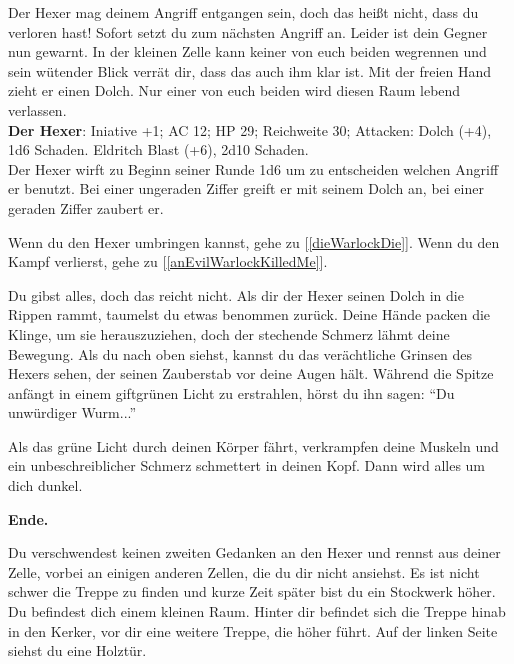 
Der Hexer mag deinem Angriff entgangen sein, doch das heißt nicht, dass du verloren hast! Sofort setzt du zum nächsten Angriff an. Leider ist dein Gegner nun gewarnt. In der kleinen Zelle kann keiner von euch beiden wegrennen und sein wütender Blick verrät dir, dass das auch ihm klar ist. Mit der freien Hand zieht er einen Dolch. Nur einer von euch beiden wird diesen Raum lebend verlassen.\\

\textbf{Der Hexer}: Iniative +1;
AC 12;
HP 29;
Reichweite 30;
Attacken: Dolch (+4), 1d6 Schaden. Eldritch Blast (+6), 2d10 Schaden.\\

Der Hexer wirft zu Beginn seiner Runde 1d6 um zu entscheiden welchen Angriff er benutzt. Bei einer ungeraden Ziffer greift er mit seinem Dolch an, bei einer geraden Ziffer zaubert er.

Wenn du den Hexer umbringen kannst, gehe zu [\ref{dieWarlockDie}].
Wenn du den Kampf verlierst, gehe zu [\ref{anEvilWarlockKilledMe}].


Du gibst alles, doch das reicht nicht. Als dir der Hexer seinen Dolch in die Rippen rammt, taumelst du etwas benommen zurück. Deine Hände packen die Klinge, um sie herauszuziehen, doch der stechende Schmerz lähmt deine Bewegung. Als du nach oben siehst, kannst du das verächtliche Grinsen des Hexers sehen, der seinen Zauberstab vor deine Augen hält. Während die Spitze anfängt in einem giftgrünen Licht zu erstrahlen, hörst du ihn sagen: ``Du unwürdiger Wurm...''

Als das grüne Licht durch deinen Körper fährt, verkrampfen deine Muskeln und ein unbeschreiblicher Schmerz schmettert in deinen Kopf. Dann wird alles um dich dunkel.

\textbf{Ende.}


Du verschwendest keinen zweiten Gedanken an den Hexer und rennst aus deiner Zelle, vorbei an einigen anderen Zellen, die du dir nicht ansiehst. Es ist nicht schwer die Treppe zu finden und kurze Zeit später bist du ein Stockwerk höher. Du befindest dich einem kleinen Raum. Hinter dir befindet sich die Treppe hinab in den Kerker, vor dir eine weitere Treppe, die höher führt. Auf der linken Seite siehst du eine Holztür.

